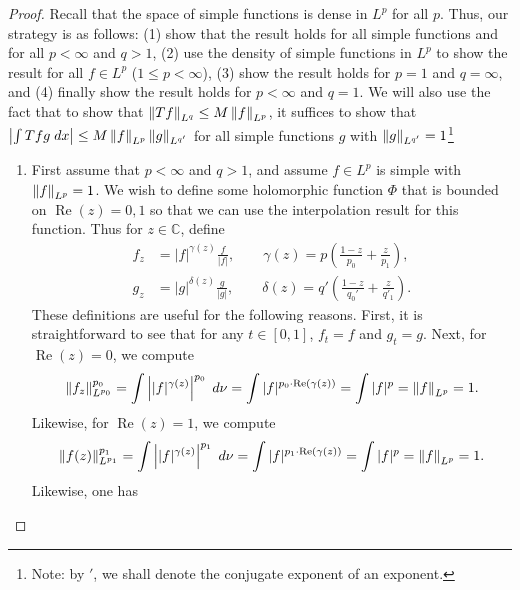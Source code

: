 \documentclass{article}
\begin{document}
\begin{proof}
	Recall that the space of simple functions is dense in $L^{p}$ for all $p$. Thus, our strategy is as follows: (1) show that the result holds for all simple functions and for all $p < \infty$ and $q > 1$, (2) use the density of simple functions in $L^{p}$ to show the result for all $f \in L^{p}$ ($1 \leq p < \infty$), (3) show the result holds for $p = 1$ and $q = \infty$, and (4) finally show the result holds for $p < \infty$ and $q = 1$. We will also use the fact that to show that $\left\Vert Tf \right\Vert_{L^{q}} \leq M \left\Vert f \right\Vert_{L^p}$, it suffices to show that $\left| \int Tfg\;dx \right| \leq M \left\Vert f \right\Vert_{L^{p}}\left\Vert g \right\Vert_{L^{q'}}$ for all simple functions $g$ with $\left\Vert g \right\Vert_{L^{q'}} = 1$\footnote{Note: by $'$, we shall denote the conjugate exponent of an exponent.} \vspace{-0.25cm}
	\begin{enumerate}[itemsep =-2pt,label= (\arabic{*})]
		\item First assume that $p < \infty$ and $q > 1$, and assume $f \in L^{p}$ is simple with $\left\Vert f \right\Vert_{L^{p}} = 1$. We wish to define some holomorphic function $\Phi$ that is bounded on $\operatorname{Re}(z) = 0, 1$ so that we can use the interpolation result for this function. Thus for $z \in \mathbb{C}$, define 
		\begin{align*}
			f_{z} &= |f|^{\gamma(z)}\frac{f}{|f|},  \qquad \gamma(z) = p\left(\frac{1 - z}{p_{0}} + \frac{z}{p_{1}}\right), \\
			g_{z} &= |g|^{\delta(z)}\frac{g}{|g|}, \qquad \delta(z) = q'\left(\frac{1 - z}{q_{0}'} + \frac{z}{q'_{1}}\right). 
		\end{align*}
		These definitions are useful for the following reasons. First, it is straightforward to see that for any $t \in [0,1]$, $f_{t} = f$ and $g_{t} = g$. Next, for $\operatorname{Re}(z) = 0$, we compute
		\begin{equation*}
			\left\Vert f_{z} \right\Vert_{L^{p_{0}}}^{p_{0}} = \int \left| |f|^{\gamma(z)} \right|^{p_{0}}\;d\nu = \int |f|^{p_{0}\cdot \operatorname{Re}(\gamma(z))} = \int |f|^{p} = \left\Vert f \right\Vert_{L^{p}} = 1. 
		\end{equation*}
		Likewise, for $\operatorname{Re}(z) = 1$, we compute 
		\begin{equation*}
			\left\Vert f(z) \right\Vert_{L^{p_{1}}}^{p_{1}} = \int \left| |f|^{\gamma(z)} \right|^{p_{1}}\;d\nu = \int |f|^{p_{1} \cdot \operatorname{Re}(\gamma(z))} = \int |f|^{p} = \left\Vert f \right\Vert_{L^{p}} = 1. 
		\end{equation*} 
		Likewise, one has 
		\begin{equation*}

\end{equation*}
\end{enumerate}
\end{proof}
\end{document}
